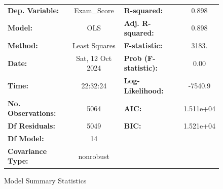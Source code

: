 \documentclass[twocolumn]{article} %
\begin{document}
\begin{figure}[ht]
  \centering
  
  \begin{subtable}{\textwidth}
    \centering
    \begin{tabular}{lclc}
      \toprule
      \textbf{Dep. Variable:}                             &   Exam\_Score    & \textbf{  R-squared:         } &     0.898   \\
      \textbf{Model:}                                     &       OLS        & \textbf{  Adj. R-squared:    } &     0.898   \\
      \textbf{Method:}                                    &  Least Squares   & \textbf{  F-statistic:       } &     3183.   \\
      \textbf{Date:}                                      & Sat, 12 Oct 2024 & \textbf{  Prob (F-statistic):} &     0.00    \\
      \textbf{Time:}                                      &     22:32:24     & \textbf{  Log-Likelihood:    } &   -7540.9   \\
      \textbf{No. Observations:}                          &        5064      & \textbf{  AIC:               } & 1.511e+04   \\
      \textbf{Df Residuals:}                              &        5049      & \textbf{  BIC:               } & 1.521e+04   \\
      \textbf{Df Model:}                                  &          14      & \textbf{                     } &             \\
      \textbf{Covariance Type:}                           &    nonrobust     & \textbf{                     } &             \\
      \bottomrule
      \end{tabular}
    \caption{Model Summary Statistics}
    \label{tab:model_summary-low}
  \end{subtable}

  \vspace{1em} %
  

\end{figure}
\end{document}
